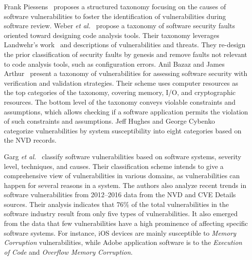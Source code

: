 \par
Frank Piessens~\cite{Piessens2002ATO} proposes a structured taxonomy focusing on the causes of software vulnerabilities to foster the identification of vulnerabilities during software review. Weber \textit{et al.}~\cite{Weber2005ASF} propose a taxonomy of software security faults oriented toward designing code analysis tools. Their taxonomy leverages Landwehr’s work~\cite{taxonomy_security_flaws} and descriptions of vulnerabilities and threats. They re-design the prior classification of security faults by genesis and remove faults not relevant to code analysis tools, such as configuration errors. Anil Bazaz and James Arthur~\cite{Bazaz2007TowardsAT} present a taxonomy of vulnerabilities for assessing software security with verification and validation strategies. Their scheme uses computer resources as the top categories of the taxonomy, covering memory, I/O, and cryptographic resources. The bottom level of the taxonomy conveys violable constraints and assumptions, which allows checking if a software application permits the violation of such constraints and assumptions. Jeff Hughes and George Cybenko~\cite{Hughes2013QuantitativeMA} categorize vulnerabilities by system susceptibility into eight categories based on the NVD records.
\par
Garg \textit{et al.}~\cite{Garg2019AnalysisOS} classify software vulnerabilities based on software systems, severity level, techniques, and causes. Their classification scheme intends to give a comprehensive view of vulnerabilities in various domains, as vulnerabilities can happen for several reasons in a system. The authors also analyze recent trends in software vulnerabilities from 2012–2016 data from the NVD and CVE Details sources. Their analysis indicates that $76\%$ of the total vulnerabilities in the software industry result from only five types of vulnerabilities. It also emerged from the data that few vulnerabilities have a high prominence of affecting specific software systems. For instance, iOS devices are mainly susceptible to \textit{Memory Corruption} vulnerabilities, while Adobe application software is to the \textit{Execution of Code} and \textit{Overflow Memory Corruption}.
\par
